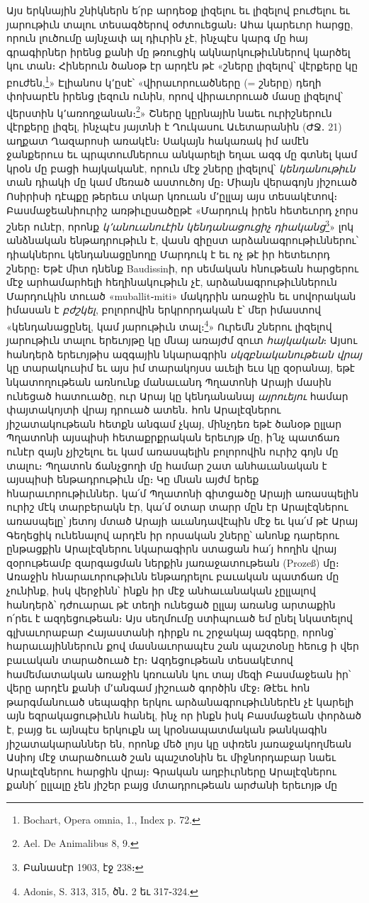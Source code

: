 \documentclass{article}
\begin{document}
{Այս երկնային շնիկներն ե՛րբ արդեօք լիզելու եւ լիզելով բուժելու եւ յարութիւն տալու տեսագծերով օժտուեցան։ Ահա կարեւոր հարցը, որուն լուծումը այնչափ ալ դիւրին չէ, ինչպէս կարգ մը հայ գրագիրներ իրենց քանի մը թռուցիկ ակնարկութիւններով կարծել կու տան։ Հիներուն ծանօթ էր արդէն թէ «շները լիզելով՝ վէրքերը կը բուժեն,\footnote{Bochart, Opera omnia, 1., Index p. 72.}» Էլիանոս կ՚ըսէ՝ «վիրաւորուածները (= շները) դեղի փոխարէն իրենց լեզուն ունին, որով վիրաւորուած մասը լիզելով՝ վերստին կ՚առողջանան։\footnote{Ael. De Animalibus 8, 9.}» Շները կըրնային նաեւ ուրիշներուն վէրքերը լիզել, ինչպէս յայտնի է Ղուկասու Աւետարանին (ԺՋ․ 21) աղքատ Ղազարոսի առակէն։ Սակայն հակառակ իմ ամէն ջանքերուս եւ պրպտումներուս անկարելի եղաւ ազգ մը գտնել կամ կրօն մը բացի հայկականէ, որուն մէջ շները լիզելով՝ \emph{կենդանութիւն} տան դիակի մը կամ մեռած աստուծոյ մը։ Միայն վերագոյն յիշուած Ոսիրիսի դէպքը թերեւս տկար կռուան մ՚ըլլայ այս տեսակէտով։ Բասմաջեանիուրիշ առթիւըսածըթէ «Մարդուկ իրեն հետեւորդ չորս շներ ունէր, որոնք \emph{կ՚անուանուէին կենդանացուցիչ դիականց}\footnote{Բանասէր 1903, էջ 238։}» լոկ անձնական ենթադրութիւն է, վասն զիըստ արձանագրութիւններու՝ դիակներու կենդանացընողը Մարդուկ է եւ ոչ թէ իր հետեւորդ շները։ Եթէ միտ դնենք Baudissinի, որ սեմական հնութեան հարցերու մէջ արհամարհելի հեղինակութիւն չէ, արձանագրութիւններուն Մարդուկին տուած «muballit֊miti» մակդրին առաջին եւ սովորական իմասան է \emph{բժշկել}, բոլորովին երկրորդական է՝ մեր իմաստով «կենդանացընել, կամ յարութիւն տալ։\footnote{Adonis, S. 313, 315, ծն․ 2 եւ 317֊324.}» Ուրեմն շներու լիզելով յարութիւն տալու երեւոյթը կը մնայ առայժմ զուտ \emph{հայկական}։ Այսու հանդերձ երեւոյթիս ազգային նկարագրին \emph{սկզբնականութեան վրայ} կը տարակուսիմ եւ այս իմ տարակոյսս աւելի եւս կը զօրանայ, եթէ նկատողութեան առնունք մանաւանդ Պղատոնի Արայի մասին ունեցած հատուածը, ուր Արայ կը կենդանանայ \emph{այրուեյու} համար փայտակոյտի վրայ դրուած ատեն․ հոն Արալէզներու յիշատակութեան հետքն անգամ չկայ, մինչդեռ եթէ ծանօթ ըլլար Պղատոնի այսպիսի հետաքրքրական երեւոյթ մը, ի՛նչ պատճառ ունէր զայն չյիշելու եւ կամ առասպելին բոլորովին ուրիշ գոյն մը տալու։ Պղատոն ճանչցողի մը համար շատ անհաւանական է այսպիսի ենթադրութիւն մը։ Կը մնան այժմ երեք հնարաւորութիւններ․ կա՛մ Պղատոնի գիտցածը Արայի առասպելին ուրիշ մէկ տարբերակն էր, կա՛մ օտար տարր մըն էր Արալէզներու առասպելը՝ յետոյ մտած Արայի աւանդավէպին մէջ եւ կա՛մ թէ Արայ Գեղեցիկ ունենալով արդէն իր որսական շները՝ անոնք դարերու ընթացքին Արալէզներու նկարագիրն ստացան հա՛յ հողին վրայ զօրութեամբ զարգացման ներքին յառաջատութեան (Prozeß) մը։ Առաջին հնարաւորութիւնն ենթադրելու բաւական պատճառ մը չունինք, իսկ վերջինն՝ ինքն իր մէջ անհաւանական չըլլալով հանդերձ՝ դժուարաւ թէ տեղի ունեցած ըլլայ առանց արտաքին ո՛րեւ է ազդեցութեան։ Այս սեղմումը ստիպուած եմ ընել նկատելով գլխաւորաբար Հայաստանի դիրքն ու շրջակայ ազգերը, որոնց՝ հարաւայիններուն քով մասնաւորապէս շան պաշտօնը հեուց ի վեր բաւական տարածուած էր։ Ազդեցութեան տեսակէտով համեմատական առաջին կռուանն կու տայ մեզի Բասմաջեան իր՝ վերը արդէն քանի մ՚անգամ յիշուած գործին մէջ։ Թէեւ հոն թարգմանուած սեպագիր երկու արձանագրութիւններէն չէ կարելի այն եզրակացութիւնն հանել, ինչ որ ինքն իսկ Բասմաջեան փորձած է, բայց եւ այնպէս երկուքն ալ կրօնապատմական թանկագին յիշատակարաններ են, որոնք մեծ լոյս կը սփռեն յառաջակողմեան Ասիոյ մէջ տարածուած շան պաշտօնին եւ միջնորդաբար նաեւ Արալէզներու հարցին վրայ։ Գրական աղբիւրները Արալէզներու քանի՛ ըլլալը չեն յիշեր բայց մտադրութեան արժանի երեւոյթ մը }
\end{document}
